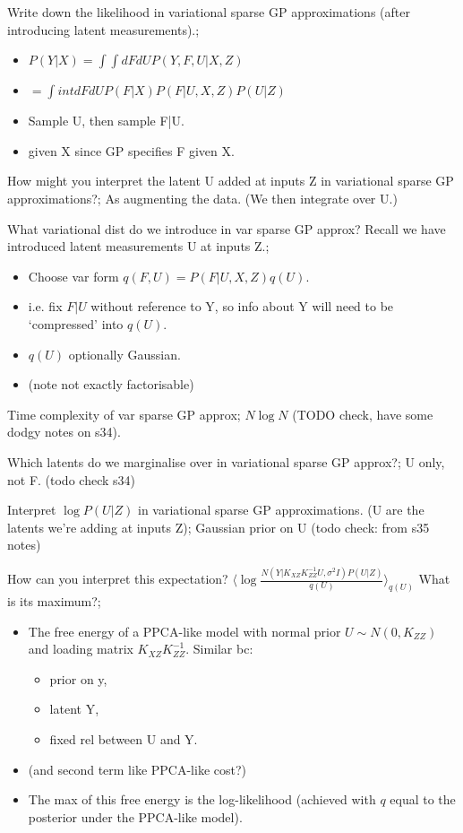 \documentclass{article}
\begin{document}
Write down the likelihood in variational sparse GP approximations (after introducing latent measurements).; \begin{itemize}
    \item $P(Y|X)=\int \int dFdU P(Y, F, U|X, Z)$
    \item $=\int int dFdU P(F|X)P(F|U, X, Z)P(U|Z)$
    \item Sample U, then sample F|U.
    \item given X since GP specifies F given X.
\end{itemize}

How might you interpret the latent U added at inputs Z in variational sparse GP approximations?; As augmenting the data. (We then integrate over U.)

What variational dist do we introduce in var sparse GP approx? Recall we have introduced latent measurements U at inputs Z.; \begin{itemize}
    \item Choose var form $q(F, U)=P(F|U, X, Z)q(U)$. 
    \item i.e. fix $F|U$ without reference to Y, so info about Y will need to be `compressed' into $q(U)$.
    \item $q(U)$ optionally Gaussian.
    \item (note not exactly factorisable)
\end{itemize}

Time complexity of var sparse GP approx; $N\log N$ (TODO check, have some dodgy notes on s34).

Which latents do we marginalise over in variational sparse GP approx?; U only, not F. (todo check s34)

Interpret $\log P(U|Z)$ in variational sparse GP approximations. (U are the latents we're adding at inputs Z); Gaussian prior on U (todo check: from s35 notes)

How can you interpret this expectation? $\langle \log \frac{N(Y|K_{XZ}K_{ZZ}^{-1}U, \sigma^2I)P(U|Z)}{q(U)}\rangle_{q(U)}$ What is its maximum?; \begin{itemize}
    \item The free energy of a PPCA-like model with normal prior $U\sim N(0, K_{ZZ})$ and loading matrix $K_{XZ}K_{ZZ}^{-1}$. Similar bc:
    \begin{itemize}
        \item prior on y, \item latent Y, \item fixed rel between U and Y.
    \end{itemize}
    \item (and second term like PPCA-like cost?)
    \item The max of this free energy is the log-likelihood (achieved with $q$ equal to the posterior under the PPCA-like model).
\end{itemize}
\end{document}
